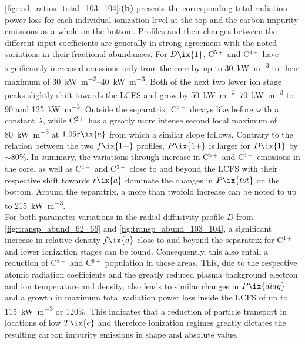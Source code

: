                 \cref{fig:rad_ratios_total_103_104}:\textbf{(b)} presents the corresponding total radiation power loss for each individual ionization level at the top and the carbon impurity emissions as a whole on the bottom. Profiles and their changes between the different input coefficients are generally in strong agreement with the noted variations in their fractional abundances. For $D\ix{1}$, C$^{5+}$ and C$^{4+}$ have significantly increased emissions only from the core by up to \SI{30}{\kilo\watt\per\cubic\meter} to their maximum of \SIrange{30}{40}{\kilo\watt\per\cubic\meter}. Both of the next two lower ion stage peaks slightly shift towards the LCFS and grow by \SIrange{50}{70}{\kilo\watt\per\cubic\meter} to 90 and \SI{125}{\kilo\watt\per\cubic\meter}. Outside the separatrix, C$^{3+}$ decays like before with a constant $\lambda$, while C$^{2+}$ has a greatly more intense second local maximum of \SI{80}{\kilo\watt\per\cubic\meter} at $1.05r\ix{a}$ from which a similar slope follows. Contrary to the relation between the two $f\ix{1+}$ profiles, $P\ix{1+}$ is larger for $D\ix{1}$ by $\sim80\%$. In summary, the variations through increase in C$^{5+}$ and C$^{4+}$ emissions in the core, as well as C$^{4+}$ and C$^{3+}$ close to and beyond the LCFS with their respective shift towards $r\ix{a}$ dominate the changes in $P\ix{tot}$ on the bottom. Around the separatrix, a more than twofold increase can be noted to up to \SI{215}{\kilo\watt\per\cubic\meter}.\\%
                For both parameter variations in the radial diffusivity profile $D$ from \cref{fig:transp_abund_62_66} and \ref{fig:transp_abund_103_104}, a significant increase in relative density $f\ix{a}$ close to and beyond the separatrix for C$^{4+}$ and lower ionization stages can be found. Consequently, this also entail a reduction of C$^{5+}$ and C$^{6+}$ population in those areas. This, due to the respective atomic radiation coefficients and the greatly reduced plasma background electron and ion temperature and density, also leads to similar changes in $P\ix{diag}$ and a growth in maximum total radiation power loss inside the LCFS of up to \SI{115}{\kilo\watt\per\cubic\meter} or 120\%. This indicates that a reduction of particle transport in locations of low $T\ix{e}$ and therefore ionization regimes greatly dictates the resulting carbon impurity emissions in shape and absolute value.%
%
